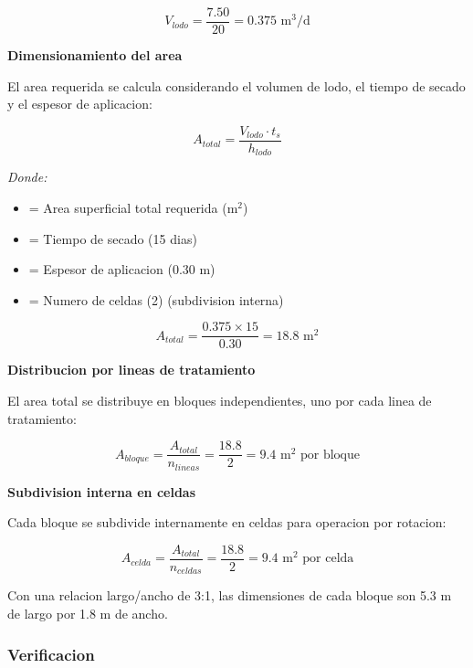\documentclass[12pt,a4paper]{article}
\begin{document}
\begin{equation}
V_{lodo} = \frac{7.50}{20} = 0.375 \text{ m}^3\text{/d}
\end{equation}

\textbf{Dimensionamiento del area}

El area requerida se calcula considerando el volumen de lodo, el tiempo de secado y el espesor de aplicacion:

\begin{equation}
A_{total} = \frac{V_{lodo} \cdot t_s}{h_{lodo}}
\end{equation}

\textit{Donde:}
\begin{itemize}[noitemsep,leftmargin=2em]
    \item[$A_{total}$] = Area superficial total requerida (m$^2$)
    \item[$t_s$] = Tiempo de secado (15 dias)
    \item[$h_{lodo}$] = Espesor de aplicacion (0.30 m)
    \item[$n_{celdas}$] = Numero de celdas (2) (subdivision interna)
\end{itemize}

\begin{equation}
A_{total} = \frac{0.375 \times 15}{0.30} = 18.8 \text{ m}^2
\end{equation}

\textbf{Distribucion por lineas de tratamiento}

El area total se distribuye en bloques independientes, uno por cada linea de tratamiento:

\begin{equation}
A_{bloque} = \frac{A_{total}}{n_{lineas}} = \frac{18.8}{2} = 9.4 \text{ m}^2 \text{ por bloque}
\end{equation}

\textbf{Subdivision interna en celdas}

Cada bloque se subdivide internamente en celdas para operacion por rotacion:

\begin{equation}
A_{celda} = \frac{A_{total}}{n_{celdas}} = \frac{18.8}{2} = 9.4 \text{ m}^2 \text{ por celda}
\end{equation}

Con una relacion largo/ancho de 3:1, las dimensiones de cada bloque son 5.3 m de largo por 1.8 m de ancho.

\subsubsection{Verificacion}
\end{document}
